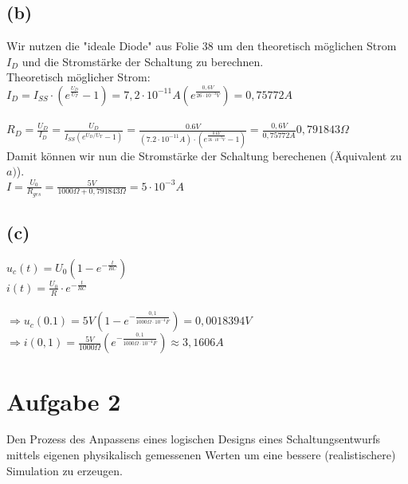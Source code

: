 \documentclass[a4paper]{scrartcl}
\begin{document}
\subsection*{(b)}
Wir nutzen die "ideale Diode" aus Folie 38 um den theoretisch möglichen Strom $I_D$ und die Stromstärke der Schaltung zu berechnen.\\
Theoretisch möglicher Strom:\\
$I_D = I_{SS} \cdot ( e^{\frac{U_D}{U_T}} - 1 ) = 7,2 \cdot 10^{-11}A (e^{\frac{0,6V}{26 \cdot 10^{-3}V}}) = 0,75772A$\\
~\\
$
R_D = \frac{U_D}{I_D} = \frac{U_D}{I_{SS} (e^{U_D/ U_T} - 1) } = \frac { 0.6  V } { \left( 7.2 \cdot 10 ^ { - 11 } A \right) \cdot \left( e ^ { \frac { 0.6 V } { 26 \cdot 10 ^ { - 3 } V}  } - 1 \right) } = \frac{0,6V}{0,75772A} 0,791843 \Omega
$\\
Damit können wir nun die Stromstärke der Schaltung berechenen (Äquivalent zu $a)$).\\
$I = \frac{U_0}{R_{ges}} = \frac{5V}{1000\Omega + 0,791843 \Omega} = 5 \cdot 10^{-3}A$


\subsection*{(c)}
$u_c (t) = U_0(1 - e ^{- \frac{t}{RC}})$\\
$i(t) = \frac{U_0}{R} \cdot e^{- \frac{t}{RC}}$\\
~\\
$\Rightarrow u_c(0.1) = 5V (1 - e ^{ - \frac{0,1}{1000 \Omega \cdot 10^{-4}F }}) = 0,0018394V$\\
$\Rightarrow i(0,1) = \frac{5V}{1000\Omega} (e^{-\frac{0,1}{1000\Omega \cdot 10^{-4}F}} ) \approx 3,1606A$


\section*{Aufgabe 2}
Den Prozess des Anpassens eines logischen Designs eines Schaltungsentwurfs mittels eigenen physikalisch gemessenen Werten um eine bessere (realistischere) Simulation zu erzeugen.
\end{document}
